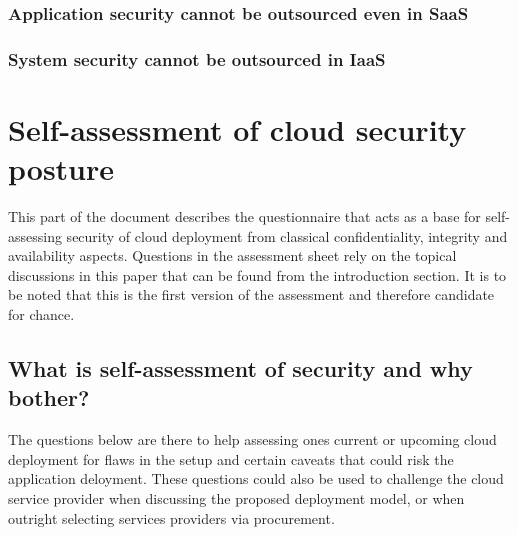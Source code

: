 \documentclass{article}
\begin{document}
\subsubsection{Application security cannot be outsourced even in SaaS}
\subsubsection{System security cannot be outsourced in IaaS}
\section{Self-assessment of cloud security posture}
This part of the document describes the questionnaire that acts as a base for self-assessing security of cloud deployment from classical confidentiality, integrity and availability aspects. Questions in the assessment sheet rely on the topical discussions in this paper that can be found from the introduction section. It is to be noted that this is the first version of the assessment and therefore candidate for chance. 
\subsection{What is self-assessment of security and why bother?}
The questions below are there to help assessing ones current or upcoming cloud deployment for flaws in the setup and certain caveats that could risk the application deloyment. These questions could also be used to challenge the cloud service provider when discussing the proposed deployment model, or when outright selecting services providers via procurement.
\end{document}
